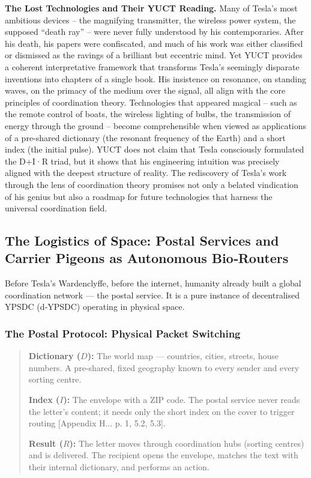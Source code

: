 \documentclass[12pt,a4paper]{article}
\begin{document}
	\textbf{The Lost Technologies and Their YUCT Reading.} Many of Tesla's most ambitious devices -- the magnifying transmitter, the wireless power system, the supposed ``death ray'' -- were never fully understood by his contemporaries. After his death, his papers were confiscated, and much of his work was either classified or dismissed as the ravings of a brilliant but eccentric mind. Yet YUCT provides a coherent interpretative framework that transforms Tesla's seemingly disparate inventions into chapters of a single book. His insistence on resonance, on standing waves, on the primacy of the medium over the signal, all align with the core principles of coordination theory. Technologies that appeared magical -- such as the remote control of boats, the wireless lighting of bulbs, the transmission of energy through the ground -- become comprehensible when viewed as applications of a pre-shared dictionary (the resonant frequency of the Earth) and a short index (the initial pulse). YUCT does not claim that Tesla consciously formulated the D+I·R triad, but it shows that his engineering intuition was precisely aligned with the deepest structure of reality. The rediscovery of Tesla's work through the lens of coordination theory promises not only a belated vindication of his genius but also a roadmap for future technologies that harness the universal coordination field.
	
	\subsection{The Logistics of Space: Postal Services and Carrier Pigeons as Autonomous Bio‑Routers}
	\label{subsec:postal-pigeons}
	
	Before Tesla’s Wardenclyffe, before the internet, humanity already built a global coordination network — the postal service. It is a pure instance of decentralised YPSDC (d‑YPSDC) operating in physical space.
	
	\subsubsection{The Postal Protocol: Physical Packet Switching}
	
	\begin{quote}
		\textbf{Dictionary ($D$):} The world map — countries, cities, streets, house numbers. A pre‑shared, fixed geography known to every sender and every sorting centre.
		
		\textbf{Index ($I$):} The envelope with a ZIP code. The postal service never reads the letter’s content; it needs only the short index on the cover to trigger routing [Appendix H... p. 1, 5.2, 5.3].
		
		\textbf{Result ($R$):} The letter moves through coordination hubs (sorting centres) and is delivered. The recipient opens the envelope, matches the text with their internal dictionary, and performs an action.
	\end{quote}
	
\end{document}
